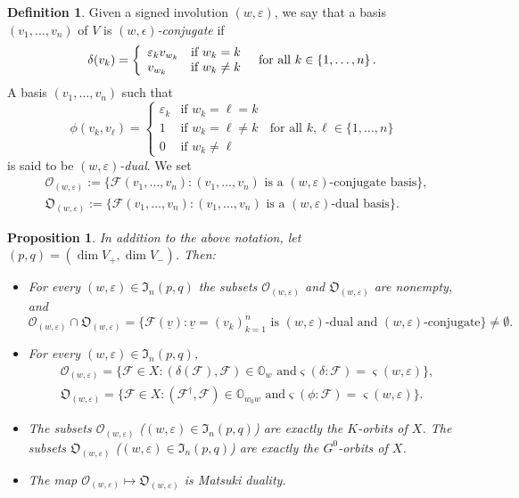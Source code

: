 \documentclass{amsart}
\newtheorem{proposition}{Proposition}
\theoremstyle{definition}
\newtheorem{definition}{Definition}
\begin{document}
\begin{definition}
\label{D2}
\label{DA3}
Given a signed involution
$(w,\varepsilon)$, we say that
a basis $(v_1,\ldots,v_n)$ of $V$ is \emph{$(w,\epsilon)$-conjugate} if
\[
\delta(v_k)=\left\{\begin{array}{ll} \varepsilon_kv_{w_k} & \mbox{if
$w_k=k$}
\\ v_{w_k} & \mbox{if $w_k\not=k$}
\end{array}\right.
\ \mbox{ for all $k\in\{1,\ldots,n\}$\,.}
\]
A basis
$(v_1,\ldots,v_n)$ such that
\[\phi(v_k,v_\ell)=\left\{\begin{array}{ll} \varepsilon_k & \mbox{if $w_k=\ell=k$} \\ 1 & \mbox{if $w_k=\ell\not=k$} \\ 0 & \mbox{if $w_k\not=\ell$} \end{array}\right.
\ \mbox{ for all $k,\ell\in\{1,\ldots,n\}$}\] is said to be {\em
$(w,\varepsilon)$-dual}.
We set
\begin{eqnarray*}
 & \mathcal{O}_{(w,\varepsilon)}:=\{\mathcal{F}(v_1,\ldots,v_n):\mbox{$(v_1,\ldots,v_n)$ is a $(w,\varepsilon)$-conjugate basis}\}, \\[1mm]
 & \mathfrak{O}_{(w,\varepsilon)}:=\{\mathcal{F}(v_1,\ldots,v_n):\mbox{$(v_1,\ldots,v_n)$ is a $(w,\varepsilon)$-dual basis}\}.
\end{eqnarray*}
\end{definition}



\begin{proposition}
\label{P2} 
In addition to the above notation, let $(p,q)=(\dim V_+,\dim V_-)$. Then:
\begin{itemize}
\item[\rm (a)] For every $(w,\varepsilon)\in\mathfrak{I}_n(p,q)$ the subsets $\mathcal{O}_{(w,\varepsilon)}$ and $\mathfrak{O}_{(w,\varepsilon)}$ are nonempty, and 
\[\mathcal{O}_{(w,\varepsilon)}\cap\mathfrak{O}_{(w,\varepsilon)}
=\{\mathcal{F}(\underline{v}):\mbox{$\underline{v}=(v_k)_{k=1}^n$ is $(w,\varepsilon)$-dual and $(w,\varepsilon)$-conjugate}\}\not=\emptyset.\]
\item[\rm (b)]
For every $(w,\varepsilon)\in \mathfrak{I}_n(p,q)$, 
\begin{eqnarray*}
 & \mathcal{O}_{(w,\varepsilon)}=\big\{\mathcal{F}\in
X: (\delta(\mathcal{F}),\mathcal{F})\in\mathbb{O}_{w}\mbox{ and
}\varsigma(\delta:\mathcal{F})=\varsigma(w,\varepsilon)\big\}, \\
 &\mathfrak{O}_{(w,\varepsilon)}=\big\{\mathcal{F}\in X:
(\mathcal{F}^\dag,\mathcal{F})\in\mathbb{O}_{w_0w}\mbox{ and
}\varsigma(\phi:\mathcal{F})=\varsigma(w,\varepsilon)\big\}.
\end{eqnarray*}
\item[\rm (c)]
The subsets $\mathcal{O}_{(w,\varepsilon)}$
($(w,\varepsilon)\in\mathfrak{I}_n(p,q)$) are exactly the $K$-orbits
of $X$. The subsets $\mathfrak{O}_{(w,\varepsilon)}$
($(w,\varepsilon)\in\mathfrak{I}_n(p,q)$) are exactly the
$G^0$-orbits of $X$.
\item[\rm (d)]
The map
$\mathcal{O}_{(w,\varepsilon)}\mapsto\mathfrak{O}_{(w,\varepsilon)}$
is Matsuki duality.
\end{itemize}
\end{proposition}
\end{document}
